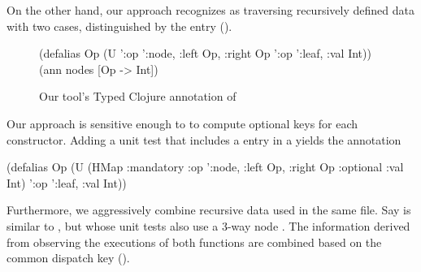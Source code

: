 %
%

On the other hand,
our approach recognizes  as traversing recursively defined
data with two cases, distinguished by the 
entry ().

\begin{figure}
\begin{cljlisting}
(defalias Op 
  (U '{:op ':node, :left Op, :right Op}
     '{:op ':leaf, :val Int}))
(ann nodes [Op -> Int])
\end{cljlisting}
  \caption{Our tool's Typed Clojure annotation of }
\label{fig:infer:nodestype}
\end{figure}

Our approach is sensitive enough to
to compute optional keys for each constructor.
Adding a unit test that includes a 
entry in a  yields the annotation
\begin{cljlisting}
(defalias Op 
  (U (HMap :mandatory
           {:op ':node, :left Op, :right Op}
           :optional {:val Int})
     '{:op ':leaf, :val Int}))
\end{cljlisting}

Furthermore, we aggressively combine recursive data used
in the same file. Say 
is similar to ,
but
whose unit tests also use a 3-way node .
The information derived from observing the executions
of both functions are combined based on
the common dispatch key ().

